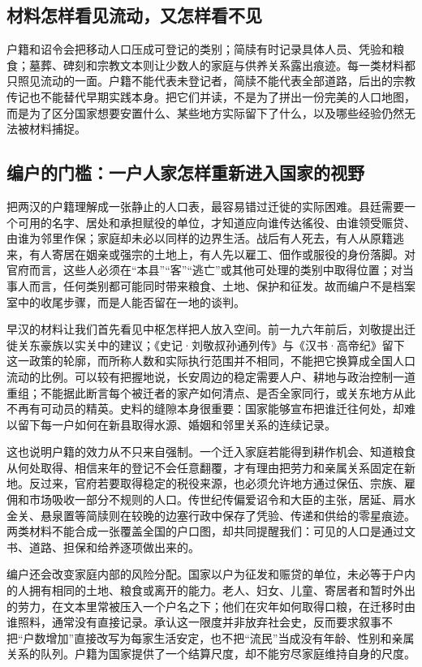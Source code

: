 \subsection{材料怎样看见流动，又怎样看不见}

户籍和诏令会把移动人口压成可登记的类别；简牍有时记录具体人员、凭验和粮食；墓葬、碑刻和宗教文本则让少数人的家庭与供养关系露出痕迹。每一类材料都只照见流动的一面。户籍不能代表未登记者，简牍不能代表全部道路，后出的宗教传记也不能替代早期实践本身。把它们并读，不是为了拼出一份完美的人口地图，而是为了区分国家想要安置什么、某些地方实际留下了什么，以及哪些经验仍然无法被材料捕捉。

\subsection{编户的门槛：一户人家怎样重新进入国家的视野}

把两汉的户籍理解成一张静止的人口表，最容易错过迁徙的实际困难。县廷需要一个可用的名字、居处和承担赋役的单位，才知道应向谁传达徭役、由谁领受赈贷、由谁为邻里作保；家庭却未必以同样的边界生活。战后有人死去，有人从原籍逃来，有人寄居在姻亲或强宗的土地上，有人先以雇工、佃作或服役的身份落脚。对官府而言，这些人必须在“本县”“客”“逃亡”或其他可处理的类别中取得位置；对当事人而言，任何类别都可能同时带来粮食、土地、保护和征发。故而编户不是档案室中的收尾步骤，而是人能否留在一地的谈判。

早汉的材料让我们首先看见中枢怎样把人放入空间。前一九六年前后，刘敬提出迁徙关东豪族以实关中的建议；《史记·刘敬叔孙通列传》与《汉书·高帝纪》留下这一政策的轮廓，而所称人数和实际执行范围并不相同，不能把它换算成全国人口流动的比例。可以较有把握地说，长安周边的稳定需要人户、耕地与政治控制一道重组；不能据此断言每个被迁者的家产如何清点、是否全家同行，或关东地方从此不再有可动员的精英。史料的缝隙本身很重要：国家能够宣布把谁迁往何处，却难以留下每一户如何在新县取得水源、婚姻和邻里关系的连续记录。

这也说明户籍的效力从不只来自强制。一个迁入家庭若能得到耕作机会、知道粮食从何处取得、相信来年的登记不会任意翻覆，才有理由把劳力和亲属关系固定在新地。反过来，官府若要取得稳定的税役来源，也必须允许地方通过保伍、宗族、雇佣和市场吸收一部分不规则的人口。传世纪传偏爱诏令和大臣的主张，居延、肩水金关、悬泉置等简牍则在较晚的边塞行政中保存了凭验、传递和供给的零星痕迹。两类材料不能合成一张覆盖全国的户口图，却共同提醒我们：可见的人口是通过文书、道路、担保和给养逐项做出来的。

编户还会改变家庭内部的风险分配。国家以户为征发和赈贷的单位，未必等于户内的人拥有相同的土地、粮食或离开的能力。老人、妇女、儿童、寄居者和暂时外出的劳力，在文本里常被压入一个户名之下；他们在灾年如何取得口粮，在迁移时由谁照料，通常没有直接记录。承认这一限度并非放弃社会史，反而要求叙事不把“户数增加”直接改写为每家生活安定，也不把“流民”当成没有年龄、性别和亲属关系的队列。户籍为国家提供了一个结算尺度，却不能穷尽家庭维持自身的尺度。

